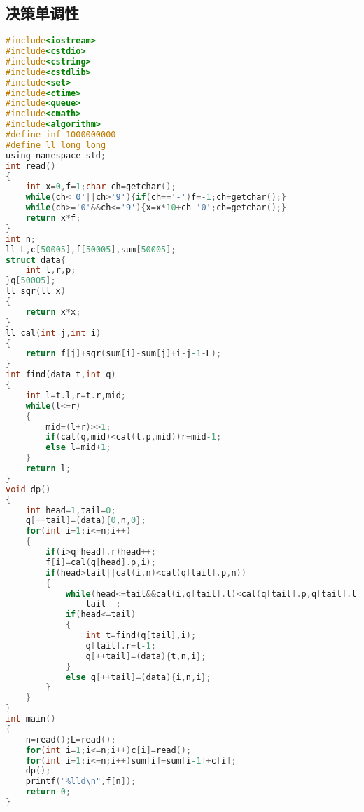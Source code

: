 \subsection{决策单调性}
\begin{lstlisting}[language=C] 
#include<iostream>
#include<cstdio>
#include<cstring>
#include<cstdlib>
#include<set>
#include<ctime>
#include<queue>
#include<cmath>
#include<algorithm>
#define inf 1000000000
#define ll long long
using namespace std;
int read()
{
    int x=0,f=1;char ch=getchar();
    while(ch<'0'||ch>'9'){if(ch=='-')f=-1;ch=getchar();}
    while(ch>='0'&&ch<='9'){x=x*10+ch-'0';ch=getchar();}
    return x*f;
}
int n;
ll L,c[50005],f[50005],sum[50005];
struct data{
	int l,r,p;
}q[50005];
ll sqr(ll x)
{
	return x*x;
}
ll cal(int j,int i)
{
	return f[j]+sqr(sum[i]-sum[j]+i-j-1-L);
}
int find(data t,int q)
{
	int l=t.l,r=t.r,mid;
	while(l<=r)
	{
		mid=(l+r)>>1;
		if(cal(q,mid)<cal(t.p,mid))r=mid-1;
		else l=mid+1;
	}
	return l;
}
void dp()
{
	int head=1,tail=0;
	q[++tail]=(data){0,n,0};
	for(int i=1;i<=n;i++)
	{
		if(i>q[head].r)head++;
		f[i]=cal(q[head].p,i);
		if(head>tail||cal(i,n)<cal(q[tail].p,n))
		{
			while(head<=tail&&cal(i,q[tail].l)<cal(q[tail].p,q[tail].l))
				tail--;
			if(head<=tail)
			{
				int t=find(q[tail],i);
				q[tail].r=t-1;
				q[++tail]=(data){t,n,i};
			}
			else q[++tail]=(data){i,n,i};
		}
	}
}
int main()
{
	n=read();L=read();
	for(int i=1;i<=n;i++)c[i]=read();
	for(int i=1;i<=n;i++)sum[i]=sum[i-1]+c[i];
	dp();
	printf("%lld\n",f[n]);
	return 0;	
}
\end{lstlisting} 
